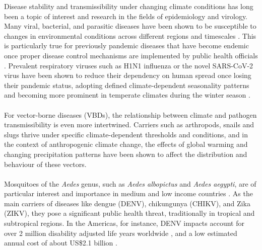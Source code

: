 \documentclass[10pt,twocolumn]{wlscirep}
\begin{document}
Disease stability and transmissibility under changing climate conditions has long been a topic of interest and research in the fields of epidemiology and virology. Many viral, bacterial, and parasitic diseases have been shown to be susceptible to changes in environmental conditions across different regions and timescales \cite{thomson_2008, malloy_2019}. This is particularly true for previously pandemic diseases that have become endemic once proper disease control mechanisms are implemented by public health officials \cite{li_2019} . Prevalent respiratory viruses such as H1N1 influenza or the novel SARS-CoV-2 virus have been shown to reduce their dependency on human spread once losing their pandemic status, adopting defined climate-dependent seasonality patterns and becoming more prominent in temperate climates during the winter season \cite{shaman_2011, romerostarke_2021}.
\\
\\
For vector-borne diseases (VBDs), the relationship between climate and pathogen transmissibility is even more intertwined. Carriers such as arthropods, snails and slugs thrive under specific climate-dependent thresholds and conditions, and in the context of anthropogenic climate change, the effects of global warming and changing precipitation patterns have been shown to affect the distribution and behaviour of these vectors\cite{lowe_2018, messina_2016}.
\\
\\
Mosquitoes of the \textit{Aedes} genus, such as \textit{Aedes albopictus} and \textit{Aedes aegypti}, are of particular interest and importance in medium and low income countries \cite{campbell-lendrum_2015}. As the main carriers of diseases like dengue (DENV), chikungunya (CHIKV), and Zika (ZIKV), they pose a significant public health threat, traditionally in tropical and subtropical regions\cite{OMS_2020}. In the Americas, for instance, DENV impacts account for over 2 million disability adjusted life years worldwide \cite{yang_2021}, and a low estimated annual cost of about US\$2.1 billion \cite{shepard_2011}.
\\
\\
\end{document}
